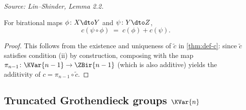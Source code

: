 \begin{lemma}
  \label{lem:homc}
  \textit{Source: Lin--Shinder, Lemma 2.2.}

  For birational maps \(\phi \colon X \dto Y\) and \(\psi \colon Y \dto Z\),
  \[
    c(\psi \circ \phi) \;=\; c(\phi) + c(\psi).
  \]
\end{lemma}
\begin{proof}
  This follows from the existence and uniqueness of \(\tilde{c}\) in
  \cref{thm:def-c}: since \(\tilde{c}\) satisfies condition (ii) by construction,
  composing with the map \(\pi_{n-1} \colon \KVar{n-1} \to \ZBir{n-1}\) (which is
  also additive) yields the additivity of \(c = \pi_{n-1} \circ \tilde{c}\).
\end{proof}

\subsection{Truncated Grothendieck groups \texorpdfstring{\(\KVar{n}\)}{K0(Var<=n/k)}}


